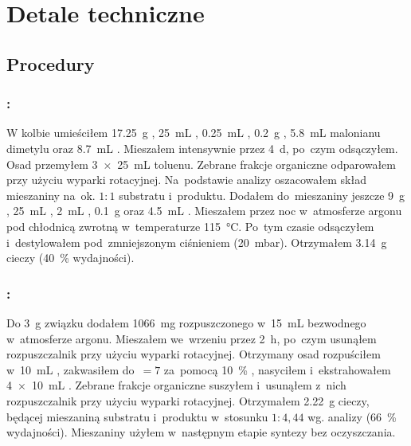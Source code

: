 \chapter{Detale techniczne}\label{chapter:experimental}

\section{Procedury}\label{experimental:procedures}
\subsection{%
  :
}\label{syn:cyclopropyl-dimethyl-malonate}
W kolbie umieściłem \SI{17.25}{\gram} , \SI{25}{\milli\liter} ,
  \SI{0.25}{\milli\liter} , \SI{0.2}{\gram} , \SI{5.8}{\milli\liter}
  malonianu dimetylu oraz \SI{8.7}{\milli\liter} .
Mieszałem intensywnie przez \SI{4}{\day}, po~czym odsączyłem.
Osad przemyłem \SI[product-units = single]{3 x 25}{\milli\liter} toluenu.
Zebrane frakcje organiczne odparowałem przy użyciu wyparki rotacyjnej.
Na~podstawie analizy  oszacowałem skład mieszaniny na~ok. $1:1$ substratu i~produktu.
Dodałem do~mieszaniny jeszcze \SI{9}{\gram} , \SI{25}{\milli\liter} ,
  \SI{2}{\milli\liter} , \SI{0.1}{\gram}  oraz \SI{4.5}{\milli\liter}
  .
Mieszałem przez noc w~atmosferze argonu pod chłodnicą zwrotną w~temperaturze \SI{115}{\degreeCelsius}.
Po~tym czasie odsączyłem i~destylowałem pod~zmniejszonym ciśnieniem (\SI{20}{\milli\bar}).
Otrzymałem \SI{3.14}{\gram} cieczy (\SI{40}{\percent} wydajności).

\subsection{%
  :
}\label{syn:cyclopropyl-monomethyl-malonate}
Do \SI{3}{\gram} związku  dodałem \SI{1066}{\milli\gram}
   rozpuszczonego w~\SI{15}{\milli\liter} bezwodnego  w~atmosferze argonu.
Mieszałem we~wrzeniu przez \SI{2}{\hour}, po~czym usunąłem rozpuszczalnik
  przy użyciu wyparki rotacyjnej.
Otrzymany osad rozpuściłem w~\SI{10}{\milli\liter} , zakwasiłem do~\pH$=7$ za~pomocą
  \SI{10}{\percent} , nasyciłem  i~ekstrahowałem
  \SI[product-units = single]{4 x 10}{\milli\liter} .
Zebrane frakcje organiczne suszyłem  i~usunąłem z~nich rozpuszczalnik
  przy użyciu wyparki rotacyjnej.
Otrzymałem \SI{2.22}{\gram} cieczy, będącej mieszaniną substratu i~produktu w~stosunku
  $1:4,44$ wg. analizy  (\SI{66}{\percent} wydajności).
Mieszaniny użyłem w~następnym etapie syntezy bez oczyszczania.

